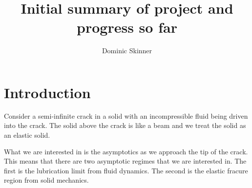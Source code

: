 \documentclass{article}
\begin{document}
\title{Initial summary of project and progress so far}
\author{Dominic Skinner}
\maketitle
\section*{Introduction}
Consider a semi-infinite crack in a solid with an incompressible fluid 
being driven into the crack. The solid above the crack is like a beam
and we treat the solid as an elastic solid.

What we are interested in is the asymptotics as we approach the tip
of the crack. This means that there are two asymptotic regimes that 
we are interested in. The first is the lubrication limit from fluid
dynamics. The second is the elastic fracure region from solid mechanics.
\end{document}
